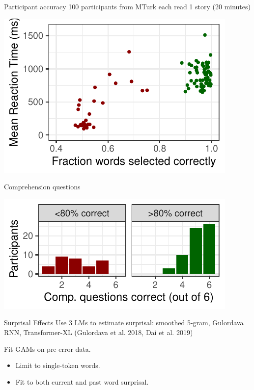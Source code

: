 \documentclass[12pt, xcolor=beamer,table,usenames,dvipsnames, ignorenonframetext, ngerman,t]{beamer}
\begin{document}
\begin{frame}{Participant accuracy}
100 participants from MTurk each read 1 story (20 minutes) \pause
\begin{center}
\includegraphics[width=.8\textwidth]{../error.pdf}
\end{center}
\end{frame}

\begin{frame}{Comprehension questions}
\begin{center} \pause
\includegraphics[width=.8\textwidth]{../comp.pdf}
\end{center}
\end{frame}


\begin{frame}{Surprisal Effects}
Use 3 LMs to estimate surprisal: smoothed 5-gram, Gulordava RNN, Transformer-XL (Gulordava et al. 2018, Dai et al. 2019)
\pause


Fit GAMs on pre-error data.
\begin{itemize}
	\item Limit to single-token words.
	\item Fit to both current and past word surprisal.
\end{itemize}

\end{frame}
\end{document}
